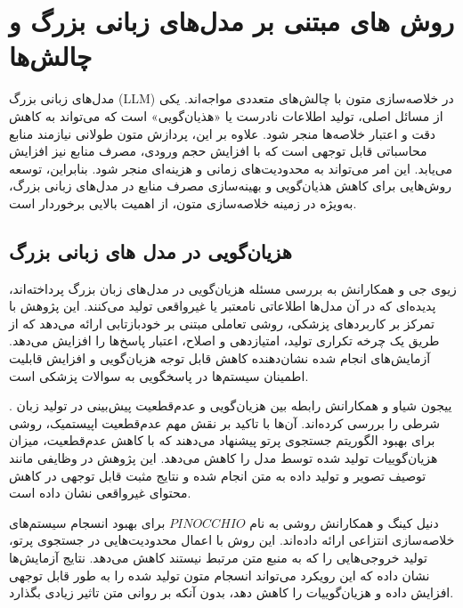 \section{روش های مبتنی بر مدل‌های زبانی بزرگ و چالش‌ها}
مدل‌های زبانی بزرگ (LLM) در خلاصه‌سازی متون با چالش‌های متعددی مواجه‌اند. یکی از مسائل اصلی، تولید اطلاعات نادرست یا «هذیان‌گویی» است که می‌تواند به کاهش دقت و اعتبار خلاصه‌ها منجر شود. علاوه بر این، پردازش متون طولانی نیازمند منابع محاسباتی قابل توجهی است که با افزایش حجم ورودی، مصرف منابع نیز افزایش می‌یابد. این امر می‌تواند به محدودیت‌های زمانی و هزینه‌ای منجر شود. بنابراین، توسعه روش‌هایی برای کاهش هذیان‌گویی و بهینه‌سازی مصرف منابع در مدل‌های زبانی بزرگ، به‌ویژه در زمینه خلاصه‌سازی متون، از اهمیت بالایی برخوردار است.
\subsection{هزیان‌گویی در مدل ‌های زبانی بزرگ}
 زیوی جی و همکارانش به بررسی مسئله هزیان‌گویی در مدل‌های زبان بزرگ پرداخته‌اند، پدیده‌ای که در آن مدل‌ها اطلاعاتی نامعتبر یا غیرواقعی تولید می‌کنند. این پژوهش با تمرکز بر کاربردهای پزشکی، روشی تعاملی مبتنی بر خودبازتابی ارائه می‌دهد که از طریق یک چرخه تکراری تولید، امتیازدهی و اصلاح، اعتبار پاسخ‌ها را افزایش می‌دهد. آزمایش‌های انجام شده نشان‌دهنده کاهش قابل توجه هزیان‌گویی و افزایش قابلیت اطمینان سیستم‌ها در پاسخگویی به سوالات پزشکی است\cite{ji-etal-2023-towards}​.

. ییجون شیاو و همکارانش رابطه بین هزیان‌گویی و عدم‌قطعیت پیش‌بینی در تولید زبان شرطی را بررسی کرده‌اند. آن‌ها با تاکید بر نقش مهم عدم‌قطعیت اپیستمیک، روشی برای بهبود الگوریتم جستجوی پرتو پیشنهاد می‌دهند که با کاهش عدم‌قطعیت، میزان هزیان‌گوییات تولید شده توسط مدل را کاهش می‌دهد. این پژوهش در وظایفی مانند توصیف تصویر و تولید داده به متن انجام شده و نتایج مثبت قابل توجهی در کاهش محتوای غیرواقعی نشان داده است\cite{xiao-wang-2021-hallucination}.

 دنیل کینگ و همکارانش روشی به نام $PINOCCHIO$ برای بهبود انسجام سیستم‌های خلاصه‌سازی انتزاعی ارائه داده‌اند. این روش با اعمال محدودیت‌هایی در جستجوی پرتو، تولید خروجی‌هایی را که به منبع متن مرتبط نیستند کاهش می‌دهد. نتایج آزمایش‌ها نشان داده که این رویکرد می‌تواند انسجام متون تولید شده را به طور قابل توجهی افزایش داده و هزیان‌گوییات را کاهش دهد، بدون آنکه بر روانی متن تاثیر زیادی بگذارد\cite{king-etal-2022-dont}​.

